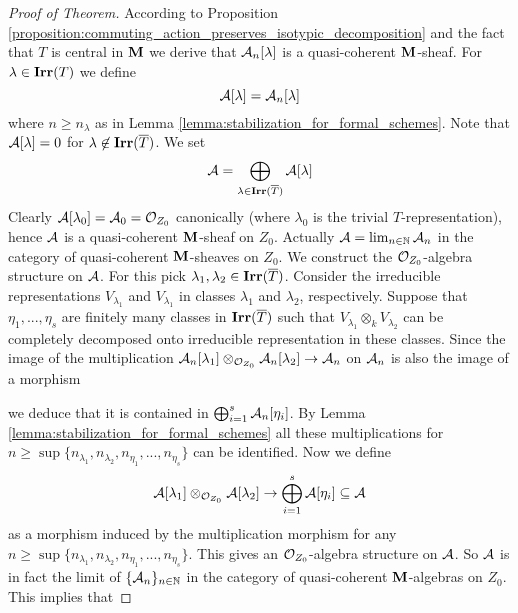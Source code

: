 \begin{proof}[Proof of Theorem]
According to Proposition \ref{proposition:commuting_action_preserves_isotypic_decomposition} and the fact that $T$ is central in $\mathbf{M}$ we derive that ${\mathcal A}_n[\lambda]$ is a quasi-coherent $\mathbf{M}$-sheaf. For $\lambda\in \mathbf{Irr}(T)$ we define
$${\mathcal A}[\lambda] = {\mathcal A}_n[\lambda]$$
where $n\geq n_{\lambda}$ as in Lemma \ref{lemma:stabilization_for_formal_schemes}. Note that ${\mathcal A}[\lambda] = 0$ for $\lambda \not \in \mathbf{Irr}(\overline{T})$. We set
$${\mathcal A}=\bigoplus_{\lambda\in \mathbf{Irr}(\overline{T})}{\mathcal A}[\lambda]$$
Clearly ${\mathcal A}[\lambda_0] = {\mathcal A}_0 = {\mathcal O}_{Z_0}$ canonically (where $\lambda_0$ is the trivial $T$-representation), hence ${\mathcal A}$ is a quasi-coherent $\mathbf{M}$-sheaf on $Z_0$. Actually ${\mathcal A}=\lim_{n\in {\mathbb N}}{\mathcal A}_n$ in the category of quasi-coherent $\mathbf{M}$-sheaves on $Z_0$. We construct the ${\mathcal O}_{Z_0}$-algebra structure on ${\mathcal A}$. For this pick $\lambda_1, \lambda_2\in \mathbf{Irr}(\overline{T})$. Consider the irreducible representations $V_{\lambda_1}$ and $V_{\lambda_1}$ in classes $\lambda_1$ and $\lambda_2$, respectively. Suppose that $\eta_1,...,\eta_s$ are finitely many classes in $\mathbf{Irr}(\overline{T})$ such that $V_{\lambda_1}\otimes_k V_{\lambda_2}$ can be completely decomposed onto irreducible representation in these classes. Since the image of the multiplication ${\mathcal A}_n[\lambda_1]\otimes_{{\mathcal O}_{Z_0}}{\mathcal A}_n[\lambda_2]\rightarrow {\mathcal A}_n$ on ${\mathcal A}_n$ is also the image of a morphism
\begin{center}
\end{center}
we deduce that it is contained in $\bigoplus_{i=1}^s{\mathcal A}_n[\eta_i]$. By Lemma \ref{lemma:stabilization_for_formal_schemes} all these multiplications for $n\geq \sup \{n_{\lambda_1},n_{\lambda_2},n_{\eta_1},...,n_{\eta_s}\}$ can be identified. Now we define
$${\mathcal A}[\lambda_1]\otimes_{{\mathcal O}_{Z_0}} {\mathcal A}[\lambda_2]\rightarrow  \bigoplus_{i=1}^s{\mathcal A}[\eta_i]\subseteq {\mathcal A}$$
as a morphism induced by the multiplication morphism for any $n\geq \sup\{n_{\lambda_1},n_{\lambda_2},n_{\eta_1},...,n_{\eta_s}\}$. This gives an ${\mathcal O}_{Z_0}$-algebra structure on ${\mathcal A}$. So ${\mathcal A}$ is in fact the limit of $\{{\mathcal A}_n\}_{n\in {\mathbb N}}$ in the category of quasi-coherent $\mathbf{M}$-algebras on $Z_0$. This implies that

\end{proof}
